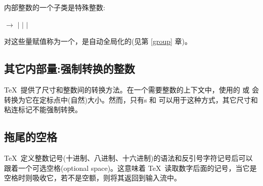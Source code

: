 \documentclass{book}
\begin{document}
内部整数的一个子类是特殊整数:
\begin{disp} $\longrightarrow$
 $|$ \nl
\indent $|$  $|$ 
\end{disp}

对这些量赋值称为一个，是自动全局化的(见第 \ref{group} 章)。

\subsection{其它内部量:强制转换的整数}


\TeX\ 提供了尺寸和整数间的转换方法。在一个需要整数的上下文中，使用的 或 会转换为它在定标点中(自然)大小。然而，只有s 和 可以用于这种方式，其它尺寸和粘连标记不能强制转换。

\subsection{拖尾的空格}


\TeX\ 定义整数记号(十进制、八进制、十六进制)的语法和反引号字符记号后可以跟着一个可选空格(optional space)。这意味着 \TeX\ 读取数字后面的记号，当它是空格时则吸收它，若不是空额，则将其返回到输入流中。
\end{document}
